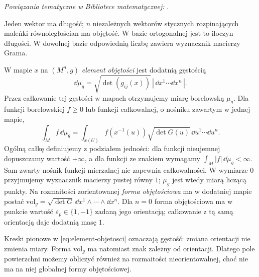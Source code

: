 \noindent\emph{Powiązania tematyczne w Bibliotece matematycznej:} .


Jeden wektor ma długość; $n$ niezależnych
wektorów stycznych rozpinających maleńki
równoległościan ma objętość. W bazie
ortogonalnej jest to iloczyn długości.
W dowolnej bazie odpowiednią liczbę
zawiera wyznacznik macierzy Grama.

\begin{definicja}
\label{def:miara-riemannowska}
W mapie $x$ na $(M^n,g)$ \emph{element objętości}
jest dodatnią gęstością
\begin{equation}\label{eq:element-objetosci}
 \dd\mu_g=\sqrt{\det(g_{ij}(x))}\,
                 |\,\dd x^1\cdots\dd x^n\,|.
\end{equation}
Przez całkowanie tej gęstości w mapach
otrzymujemy miarę borelowską $\mu_g$.
Dla funkcji borelowskiej $f\geq0$ lub funkcji całkowalnej,
o nośniku zawartym w jednej mapie,
\[
 \int_M f\,\dd\mu_g
  =\int_{x(U)} f(x^{-1}(u))
      \sqrt{\det G(u)}\,\dd u^1\cdots\dd u^n.
\]
Ogólną całkę definiujemy z podziałem jedności:
dla funkcji nieujemnej dopuszczamy wartość $+\infty$,
a dla funkcji ze znakiem wymagamy $\int_M|f|\,\dd\mu_g<\infty$.
Sam zwarty nośnik funkcji mierzalnej nie zapewnia całkowalności.
W wymiarze $0$ przyjmujemy wyznacznik macierzy pustej równy $1$;
$\mu_g$ jest wtedy miarą liczącą punkty. Na rozmaitości zorientowanej
\emph{forma objętościowa} ma w dodatniej mapie postać
$\mathrm{vol}_g=\sqrt{\det G}\,
 \dd x^1\wedge\cdots\wedge\dd x^n$.
Dla $n=0$ forma objętościowa ma w punkcie wartość
$\varepsilon_p\in\{1,-1\}$ zadaną jego orientacją;
całkowanie z tą samą orientacją daje dodatnią masę $1$.
\end{definicja}

Kreski pionowe w \eqref{eq:element-objetosci}
oznaczają gęstość: zmiana orientacji nie zmienia
miary. Forma $\mathrm{vol}_g$ ma natomiast znak
zależny od orientacji. Dlatego pole powierzchni
możemy obliczyć również na rozmaitości
nieorientowalnej, choć nie ma na niej globalnej
formy objętościowej.

